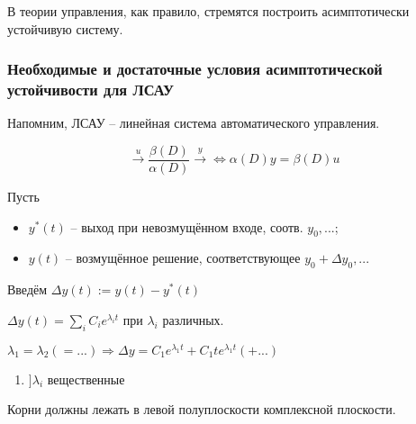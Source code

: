\documentclass[main.tex]{subfiles}
\begin{document}
В теории управления, как правило, стремятся построить асимптотически устойчивую систему.

\subsubsection{Необходимые и достаточные условия асимптотической устойчивости для ЛСАУ}

Напомним, ЛСАУ -- линейная система автоматического управления.

$$ \xrightarrow{u} \boxed{\frac{\beta(D)}{\alpha(D)}} \xrightarrow{y} \Leftrightarrow \alpha(D)y=\beta(D)u $$

Пусть
\begin{itemize}[noitemsep]
    \item $y^*(t)$ -- выход при невозмущённом входе, соотв. $y_0, ...$;
    \item $y(t) $ -- возмущённое решение, соответствующее $y_0 + \Delta y_0, ...$
\end{itemize}

Введём $ \Delta y(t) := y(t) - y^*(t) $


$ \Delta y(t) = \sum_i C_i e^{\lambda_i t} $ при $ \lambda_i $ различных.

$\lambda_1 = \lambda_2 (= ...) \Rightarrow \Delta y = C_1 e^{\lambda_1 t} + C_1 t e^{\lambda_1 t} (+ ...) $

\begin{enumerate}[noitemsep]
    \item $ ] \lambda_i $ вещественные %
\end{enumerate}

Корни должны лежать в левой полуплоскости комплексной плоскости.
\end{document}
